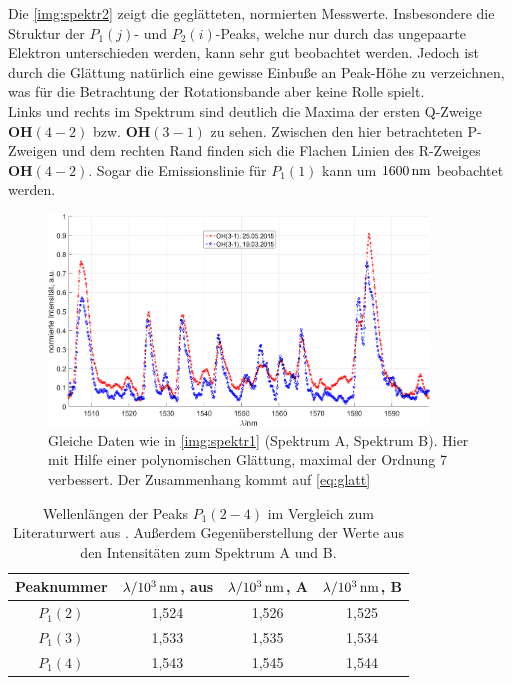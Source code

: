 \documentclass[numbers=noenddot,a4paper,notitlepage,twoside,BCOR15mm]{scrartcl}
\newcommand{\tenpo}[1]{ 10^{#1}}
\newcommand{\ix}[1]{_\text{#1}}
\newcommand{\fett}[1]{\textbf{#1}}
\begin{document}
			Die \autoref{img:spektr2} zeigt die geglätteten, normierten Messwerte. Insbesondere die Struktur der $P\ix{1}(j)$- und $P\ix{2}(i)$-Peaks, welche nur durch das ungepaarte Elektron unterschieden werden, kann sehr gut beobachtet werden. Jedoch ist durch die Glättung natürlich eine gewisse Einbuße an Peak-Höhe zu verzeichnen, was für die Betrachtung der Rotationsbande aber keine Rolle spielt.\\
			Links und rechts im Spektrum sind deutlich die Maxima der ersten Q-Zweige $\fett{OH}(4-2)$ bzw. $\fett{OH}(3-1)$ zu sehen. Zwischen den hier betrachteten P-Zweigen und dem rechten Rand finden sich die Flachen Linien des R-Zweiges $\fett{OH}(4-2)$. Sogar die Emissionslinie für $P\ix{1}(1)$ kann um $\unit[1600]{nm}$ beobachtet werden.

				\begin{figure}[h]
					\centering
					\includegraphics[width=0.9\textwidth]{spektr_smooth.png}
					\caption{Gleiche Daten wie in \autoref{img:spektr1} (Spektrum A, Spektrum B). Hier mit Hilfe einer polynomischen Glättung, maximal der Ordnung 7 verbessert. Der Zusammenhang kommt auf \autoref{eq:glatt}}
					\label{img:spektr2}
				\end{figure}

				\begin{table}[h]
					\centering
					\begin{tabular}{c|c|c|c}
						Peaknummer & $\lambda/\unit[\tenpo{3}]{nm}$, aus \cite{EMAUGreifswaldOHRot} & $\lambda/\unit[\tenpo{3}]{nm}$, A & $\lambda/\unit[\tenpo{3}]{nm}$, B\\
						\hline $P\ix{1}(2)$ & 1,524 & 1,526 & 1,525 \\
						\hline $P\ix{1}(3)$ & 1,533 & 1,535 & 1,534 \\
						\hline $P\ix{1}(4)$ & 1,543 & 1,545 & 1,544
					\end{tabular}
					\caption{Wellenlängen der Peaks $P\ix{1}(2-4)$ im Vergleich zum Literaturwert aus \cite{EMAUGreifswaldOHRot}. Außerdem Gegenüberstellung der Werte aus den Intensitäten zum Spektrum A und B.}
					\label{tab:wellen}
				\end{table}
\end{document}
